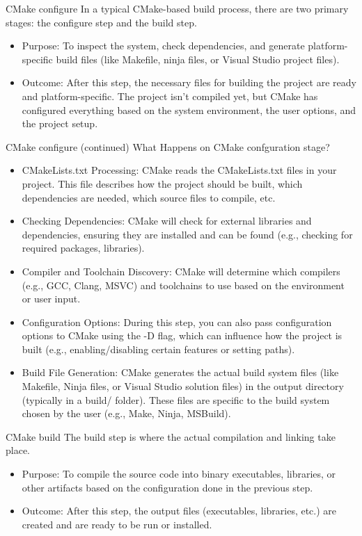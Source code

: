\documentclass{beamer}
\begin{document}
\begin{frame}{CMake configure}
  In a typical CMake-based build process, there are two primary stages: the configure step and the build step.
  \begin{itemize}
    \item Purpose: To inspect the system, check dependencies, and generate platform-specific build files (like Makefile, ninja files, or Visual Studio project files).
    \item Outcome: After this step, the necessary files for building the project are ready and platform-specific. The project isn't compiled yet, but CMake has configured everything based on the system environment, the user options, and the project setup.
  \end{itemize}
\end{frame}

\begin{frame}{CMake configure (continued)}
  \footnotesize
  What Happens on CMake confguration stage?
  \begin{itemize}
    \item CMakeLists.txt Processing: CMake reads the CMakeLists.txt files in your project. This file describes how the project should be built, which dependencies are needed, which source files to compile, etc.
    \item Checking Dependencies: CMake will check for external libraries and dependencies, ensuring they are installed and can be found (e.g., checking for required packages, libraries).
    \item Compiler and Toolchain Discovery: CMake will determine which compilers (e.g., GCC, Clang, MSVC) and toolchains to use based on the environment or user input.
    \item Configuration Options: During this step, you can also pass configuration options to CMake using the -D flag, which can influence how the project is built (e.g., enabling/disabling certain features or setting paths).
    \item Build File Generation: CMake generates the actual build system files (like Makefile, Ninja files, or Visual Studio solution files) in the output directory (typically in a build/ folder). These files are specific to the build system chosen by the user (e.g., Make, Ninja, MSBuild).
  \end{itemize}
\end{frame}

\begin{frame}{CMake build}
  The build step is where the actual compilation and linking take place.
  \begin{itemize}
    \item Purpose: To compile the source code into binary executables, libraries, or other artifacts based on the configuration done in the previous step.
    \item Outcome: After this step, the output files (executables, libraries, etc.) are created and are ready to be run or installed.
  \end{itemize}
\end{frame}
\end{document}
